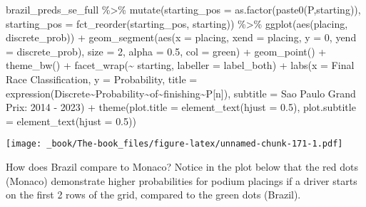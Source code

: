 \documentclass[
]{book}
\newenvironment{Shaded}{\begin{snugshade}}{\end{snugshade}}
\newcommand{\AttributeTok}[1]{\textcolor[rgb]{0.77,0.63,0.00}{#1}}
\newcommand{\DecValTok}[1]{\textcolor[rgb]{0.00,0.00,0.81}{#1}}
\newcommand{\FloatTok}[1]{\textcolor[rgb]{0.00,0.00,0.81}{#1}}
\newcommand{\FunctionTok}[1]{\textcolor[rgb]{0.00,0.00,0.00}{#1}}
\newcommand{\NormalTok}[1]{#1}
\newcommand{\SpecialCharTok}[1]{\textcolor[rgb]{0.00,0.00,0.00}{#1}}
\newcommand{\StringTok}[1]{\textcolor[rgb]{0.31,0.60,0.02}{#1}}
\begin{document}
\begin{Shaded}
\begin{Highlighting}[]
\NormalTok{brazil\_preds\_se\_full }\SpecialCharTok{\%\textgreater{}\%}
  \FunctionTok{mutate}\NormalTok{(}\AttributeTok{starting\_pos =} \FunctionTok{as.factor}\NormalTok{(}\FunctionTok{paste0}\NormalTok{(}\StringTok{\textquotesingle{}P\textquotesingle{}}\NormalTok{,starting)),}
         \AttributeTok{starting\_pos =} \FunctionTok{fct\_reorder}\NormalTok{(starting\_pos, starting)) }\SpecialCharTok{\%\textgreater{}\%}
  \FunctionTok{ggplot}\NormalTok{(}\FunctionTok{aes}\NormalTok{(placing, discrete\_prob)) }\SpecialCharTok{+}
  \FunctionTok{geom\_segment}\NormalTok{(}\FunctionTok{aes}\NormalTok{(}\AttributeTok{x =}\NormalTok{ placing, }\AttributeTok{xend =}\NormalTok{ placing, }\AttributeTok{y =} \DecValTok{0}\NormalTok{, }\AttributeTok{yend =}\NormalTok{ discrete\_prob),}
               \AttributeTok{size =} \DecValTok{2}\NormalTok{, }\AttributeTok{alpha =} \FloatTok{0.5}\NormalTok{, }\AttributeTok{col =} \StringTok{\textquotesingle{}green\textquotesingle{}}\NormalTok{) }\SpecialCharTok{+}
  \FunctionTok{geom\_point}\NormalTok{() }\SpecialCharTok{+}
  \FunctionTok{theme\_bw}\NormalTok{() }\SpecialCharTok{+}
  \FunctionTok{facet\_wrap}\NormalTok{(}\SpecialCharTok{\textasciitilde{}}\NormalTok{ starting, }\AttributeTok{labeller =}\NormalTok{ label\_both) }\SpecialCharTok{+}
  \FunctionTok{labs}\NormalTok{(}\AttributeTok{x =} \StringTok{\textquotesingle{}Final Race Classification\textquotesingle{}}\NormalTok{,}
       \AttributeTok{y =} \StringTok{\textquotesingle{}Probability\textquotesingle{}}\NormalTok{,}
       \AttributeTok{title =} \FunctionTok{expression}\NormalTok{(Discrete}\SpecialCharTok{\textasciitilde{}}\NormalTok{Probability}\SpecialCharTok{\textasciitilde{}}\NormalTok{of}\SpecialCharTok{\textasciitilde{}}\NormalTok{finishing}\SpecialCharTok{\textasciitilde{}}\NormalTok{P[n]),}
       \AttributeTok{subtitle =} \StringTok{\textquotesingle{}Sao Paulo Grand Prix: 2014 {-} 2023\textquotesingle{}}\NormalTok{) }\SpecialCharTok{+}
  \FunctionTok{theme}\NormalTok{(}\AttributeTok{plot.title =} \FunctionTok{element\_text}\NormalTok{(}\AttributeTok{hjust =} \FloatTok{0.5}\NormalTok{),}
        \AttributeTok{plot.subtitle =} \FunctionTok{element\_text}\NormalTok{(}\AttributeTok{hjust =} \FloatTok{0.5}\NormalTok{)) }
\end{Highlighting}
\end{Shaded}

\texttt{[image: \_book/The-book\_files/figure-latex/unnamed-chunk-171-1.pdf]}

How does Brazil compare to Monaco? Notice in the plot below that the red dots (Monaco) demonstrate higher probabilities for podium placings if a driver starts on the first 2 rows of the grid, compared to the green dots (Brazil).
\end{document}
